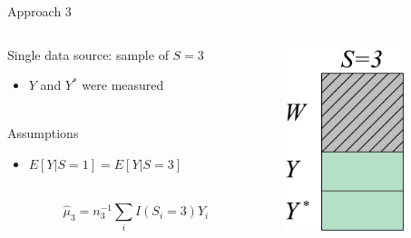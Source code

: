 \documentclass{beamer}
\begin{document}
\begin{frame}{Approach 3}
	\begin{minipage}[0.2\textheight]{\textwidth}
		\begin{columns}[T]
			\begin{column}{0.6\textwidth}
				Single data source: sample of $S=3$
				\begin{itemize}
					\item $Y$ and $Y^*$ were measured
				\end{itemize}~\\
				Assumptions
				\begin{itemize}
					\item $E[Y | S=1] = E[Y | S=3]$
				\end{itemize}~\\
				\[\hat{\mu}_3 = n_3^{-1} \sum_i I(S_i = 3) Y_i\]
			\end{column}
			\begin{column}{0.35\textwidth}
				\includegraphics[width=3.5cm]{images/data_sources3.png}
			\end{column}
		\end{columns}
	\end{minipage}	
\end{frame}
\end{document}
